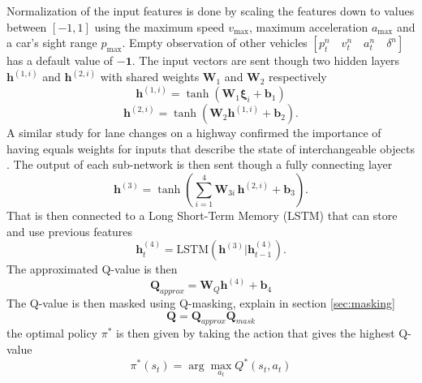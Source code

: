 Normalization of the input features is done by scaling the features down to values between $[-1,1]$ using the maximum speed $v_{\max}$, maximum acceleration $a_{\max}$ and a car's sight range $p_{\max}$. Empty observation of other vehicles $[p^n_t \quad v^n_t \quad a^n_t \quad \delta^n ]$ has a default value of $-\mathbf{1}$. The input vectors are sent though two hidden layers $\bm{h}^{(1, i)}$ and $\bm{h}^{(2, i)}$ with shared weights $\bm{W}_1$ and $\bm{W}_2$ respectively
\begin{equation}
\bm{h}^{(1, i)} = \tanh\left(\bm{W}_1 \bm\xi_i + \bm{b}_1\right)
\end{equation}
\begin{equation}
\bm{h}^{(2, i)} = \tanh\left(\bm{W}_2 \bm{h}^{(1, i)} + \bm{b}_2\right).
\end{equation}
A similar study for lane changes on a highway confirmed the importance of having equals weights for inputs that describe the state of interchangeable objects \cite{Hoel2018}. The output of each sub-network is then sent though a fully connecting layer 
\begin{equation}
\label{eq:shared_weights}
\bm{h}^{(3)} = \tanh\left(\sum_{i=1}^4 \bm{W}_{3i} \, \bm{h}^{(2, i)} + \bm{b}_3\right).
\end{equation}
That is then connected to a Long Short-Term Memory (LSTM) \cite{Hochreiter1997LONGMEMORY} that can store and use previous features
\begin{equation}
\bm{h}^{(4)}_t = \text{LSTM}\left( \bm{h}^{(3)} | \bm{h}^{(4)}_{t-1} \right).
\end{equation}
The approximated Q-value is then
\begin{equation}
\bm{Q}_{approx} = \bm{W}_Q \bm{h}^{(4)}+ \bm{b}_4
\end{equation}
The Q-value is then masked using Q-masking, explain in section \ref{sec:masking}
\begin{equation}
\bm{Q} = \bm{Q}_{approx}  \bm{Q}_{mask}
\end{equation}
the optimal policy $\pi^*$ is then given by taking the action that gives the highest Q-value
\begin{equation}
\pi^*(s_t) = \arg\max_{a_t} Q^*(s_t,a_t)
\end{equation}

